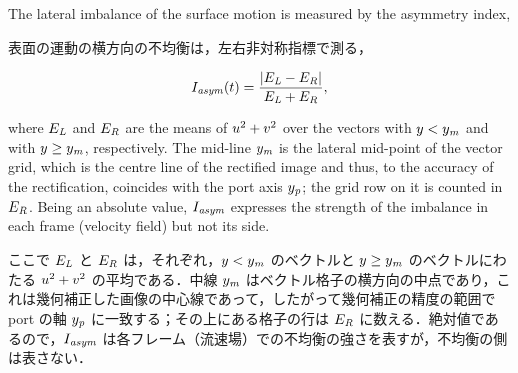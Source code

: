 
\begin{en}[M5-2]
The lateral imbalance of the surface motion is measured by the asymmetry index,
\end{en}
\begin{ja}
表面の運動の横方向の不均衡は，左右非対称指標で測る，
\end{ja}
\begin{equation}
I_{\mathit{asym}}(t) = \frac{\left| E_{\mathit{L}} - E_{\mathit{R}} \right|}{E_{\mathit{L}} + E_{\mathit{R}}} ,
\label{eq:Iasym}
\end{equation}
\begin{en}
where $E_{\mathit{L}}$ and $E_{\mathit{R}}$ are the means of $u^{2} + v^{2}$ over the vectors with $y < y_{\mathit{m}}$ and with $y \ge y_{\mathit{m}}$, respectively. The mid-line $y_{\mathit{m}}$ is the lateral mid-point of the vector grid, which is the centre line of the rectified image and thus, to the accuracy of the rectification, coincides with the port axis $y_{\mathit{p}}$; the grid row on it is counted in $E_{\mathit{R}}$. Being an absolute value, $I_{\mathit{asym}}$ expresses the strength of the imbalance in each frame (velocity field) but not its side.
\end{en}
\begin{ja}
ここで $E_{\mathit{L}}$ と $E_{\mathit{R}}$ は，それぞれ，$y < y_{\mathit{m}}$ のベクトルと $y \ge y_{\mathit{m}}$ のベクトルにわたる $u^{2} + v^{2}$ の平均である．中線 $y_{\mathit{m}}$ はベクトル格子の横方向の中点であり，これは幾何補正した画像の中心線であって，したがって幾何補正の精度の範囲で port の軸 $y_{\mathit{p}}$ に一致する；その上にある格子の行は $E_{\mathit{R}}$ に数える．絶対値であるので，$I_{\mathit{asym}}$ は各フレーム（流速場）での不均衡の強さを表すが，不均衡の側は表さない．
\end{ja}

